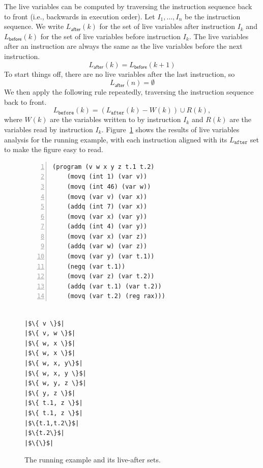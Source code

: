 \documentclass[11pt]{book}
\begin{document}
The live variables can be computed by traversing the instruction
sequence back to front (i.e., backwards in execution order).  Let
$I_1,\ldots, I_n$ be the instruction sequence. We write
$L_{\mathsf{after}}(k)$ for the set of live variables after
instruction $I_k$ and $L_{\mathsf{before}}(k)$ for the set of live
variables before instruction $I_k$. The live variables after an
instruction are always the same as the live variables before the next
instruction.
\begin{equation*}
  L_{\mathsf{after}}(k) = L_{\mathsf{before}}(k+1)
\end{equation*}
To start things off, there are no live variables after the last
instruction, so 
\begin{equation*}
  L_{\mathsf{after}}(n) = \emptyset 
\end{equation*}
We then apply the following rule repeatedly, traversing the
instruction sequence back to front.
\begin{equation*}
  L_{\mathtt{before}}(k) = (L_{\mathtt{after}}(k) - W(k)) \cup R(k),
\end{equation*}
where $W(k)$ are the variables written to by instruction $I_k$ and
$R(k)$ are the variables read by instruction $I_k$.
Figure~\ref{fig:live-eg} shows the results of live variables analysis
for the running example, with each instruction aligned with its
$L_{\mathtt{after}}$ set to make the figure easy to read.


\begin{figure}[tbp]
\hspace{20pt}
\begin{minipage}{0.45\textwidth}
\begin{lstlisting}[numbers=left]
  (program (v w x y z t.1 t.2)
    (movq (int 1) (var v))
    (movq (int 46) (var w))
    (movq (var v) (var x))
    (addq (int 7) (var x))
    (movq (var x) (var y))
    (addq (int 4) (var y))
    (movq (var x) (var z))
    (addq (var w) (var z))
    (movq (var y) (var t.1))
    (negq (var t.1))
    (movq (var z) (var t.2))
    (addq (var t.1) (var t.2))
    (movq (var t.2) (reg rax)))
\end{lstlisting}
\end{minipage}
\vrule\hspace{10pt}
\begin{minipage}{0.45\textwidth}
\begin{lstlisting}

|$\{ v \}$|
|$\{ v, w \}$|
|$\{ w, x \}$|
|$\{ w, x \}$|
|$\{ w, x, y\}$|
|$\{ w, x, y \}$|
|$\{ w, y, z \}$|
|$\{ y, z \}$|
|$\{ t.1, z \}$|
|$\{ t.1, z \}$|
|$\{t.1,t.2\}$|
|$\{t.2\}$|
|$\{\}$|
\end{lstlisting}
\end{minipage}

\caption{The running example and its live-after sets.}
\label{fig:live-eg}
\end{figure}
\end{document}
